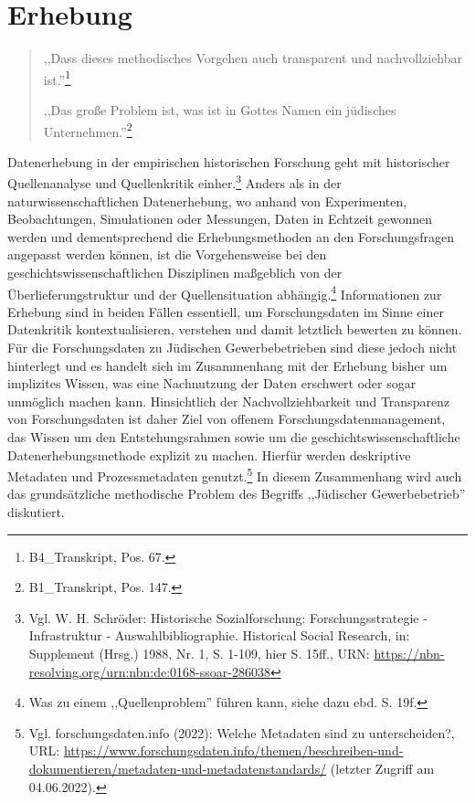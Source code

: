 \section{Erhebung}

\begin{quote}
    ,,Dass dieses methodisches Vorgehen auch transparent und nachvollziehbar ist.''\footnote{B4\_Transkript, Pos. 67.}

    ,,Das große Problem ist, was ist in Gottes Namen ein jüdisches Unternehmen.''\footnote{B1\_Transkript, Pos. 147.}
\end{quote}

Datenerhebung in der empirischen historischen Forschung geht mit historischer Quellenanalyse und Quellenkritik einher.\footnote{Vgl. W. H. Schröder: Historische Sozialforschung: Forschungsstrategie - Infrastruktur - Auswahlbibliographie.
Historical Social Research, in: Supplement (Hrsg.) 1988, Nr. 1, S. 1-109, hier S. 15ff., URN: \url{https://nbn-resolving.org/urn:nbn:de:0168-ssoar-286038}
} Anders als in der naturwissenschaftlichen Datenerhebung, wo anhand von Experimenten, Beobachtungen, Simulationen oder Messungen, Daten in Echtzeit gewonnen werden und dementsprechend die Erhebungsmethoden an den Forschungsfragen angepasst werden können, ist die Vorgehensweise bei den geschichtswissenschaftlichen Disziplinen maßgeblich von der Überlieferungstruktur und der Quellensituation abhängig.\footnote{Was zu einem ,,Quellenproblem'' führen kann, siehe dazu ebd. S. 19f.} Informationen zur Erhebung sind in beiden Fällen essentiell, um Forschungsdaten im Sinne einer Datenkritik kontextualisieren, verstehen und damit letztlich bewerten zu können. Für die Forschungsdaten zu Jüdischen Gewerbebetrieben sind diese jedoch nicht hinterlegt und es handelt sich im Zusammenhang mit der Erhebung bisher um implizites Wissen, was eine Nachnutzung der Daten erschwert oder sogar unmöglich machen kann. Hinsichtlich der Nachvollziehbarkeit und Transparenz von Forschungsdaten ist daher Ziel von offenem Forschungsdatenmanagement, das Wissen um den Entstehungsrahmen sowie um die geschichtswissenschaftliche Datenerhebungsmethode explizit zu machen. Hierfür werden deskriptive Metadaten und Prozessmetadaten genutzt.\footnote{Vgl. forschungsdaten.info (2022): Welche Metadaten sind zu unterscheiden?, URL: \url{https://www.forschungsdaten.info/themen/beschreiben-und-dokumentieren/metadaten-und-metadatenstandards/} (letzter Zugriff am 04.06.2022).} In diesem Zusammenhang wird auch das grundsätzliche methodische Problem des Begriffs ,,Jüdischer Gewerbebetrieb'' diskutiert.

